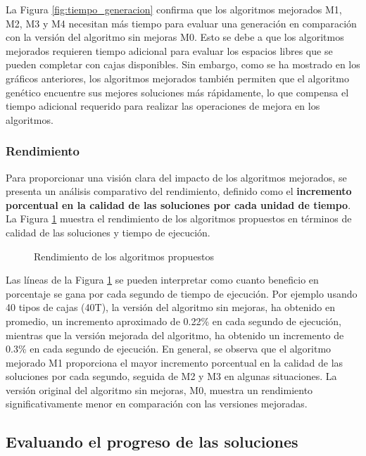 \documentclass[openany]{article}
\begin{document}
La Figura \ref{fig:tiempo_generacion} confirma que los algoritmos mejorados M1, M2, M3 y M4 necesitan más tiempo para evaluar una generación en comparación con la versión del algoritmo sin mejoras M0. Esto se debe a que los algoritmos mejorados requieren tiempo adicional para evaluar los espacios libres que se pueden completar con cajas disponibles. Sin embargo, como se ha mostrado en los gráficos anteriores, los algoritmos mejorados también permiten que el algoritmo genético encuentre sus mejores soluciones más rápidamente, lo que compensa el tiempo adicional requerido para realizar las operaciones de mejora en los algoritmos.

\subsubsection{Rendimiento}

Para proporcionar una visión clara del impacto de los algoritmos mejorados, se presenta un análisis comparativo del rendimiento, definido como el \textbf{incremento porcentual en la calidad de las soluciones por cada unidad de tiempo}. La Figura \ref{fig:rendimiento} muestra el rendimiento de los algoritmos propuestos en términos de calidad de las soluciones y tiempo de ejecución.

\begin{figure}[H]
    \centering
    
    \caption{Rendimiento de los algoritmos propuestos}
    \label{fig:rendimiento}
\end{figure}

Las líneas de la Figura \ref{fig:rendimiento} se pueden interpretar como cuanto beneficio en porcentaje se gana por cada segundo de tiempo de ejecución. Por ejemplo usando 40 tipos de cajas (40T), la versión del algoritmo sin mejoras, ha obtenido en promedio, un incremento aproximado de 0.22\% en cada segundo de ejecución, mientras que la versión mejorada del algoritmo, ha obtenido un incremento de 0.3\% en cada segundo de ejecución. En general, se observa que el algoritmo mejorado M1 proporciona el mayor incremento porcentual en la calidad de las soluciones por cada segundo, seguida de M2 y M3 en algunas situaciones. La versión original del algoritmo sin mejoras, M0, muestra un rendimiento significativamente menor en comparación con las versiones mejoradas.

\subsection{Evaluando el progreso de las soluciones}
\end{document}
